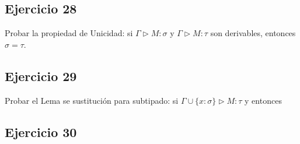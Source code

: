 \subsection*{Ejercicio 28}

Probar la propiedad de Unicidad: si $\Gamma \rhd M : \sigma$ y $\Gamma \rhd M : \tau$ son derivables, entonces $\sigma = \tau$.


\subsection*{Ejercicio 29}

Probar el Lema se sustitución para subtipado: si $\Gamma \cup \{x:\sigma\} \rhd M : \tau$ y  entonces 


\subsection*{Ejercicio 30}

